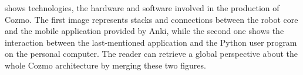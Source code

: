  shows technologies, the hardware and software involved in the production of Cozmo. The first image represents stacks and connections between the robot core and the mobile application provided by Anki, while the second one shows the interaction between the last-mentioned application and the Python user program on the personal computer. The reader can retrieve a global perspective about the whole Cozmo architecture by merging these two figures.

\begin{figure}
	\scalebox{0.9}{
		\centering
		\begin{tikzpicture}[x=0.75pt,y=0.75pt,yscale=-1,xscale=1]


\end{tikzpicture}}
\end{figure}
